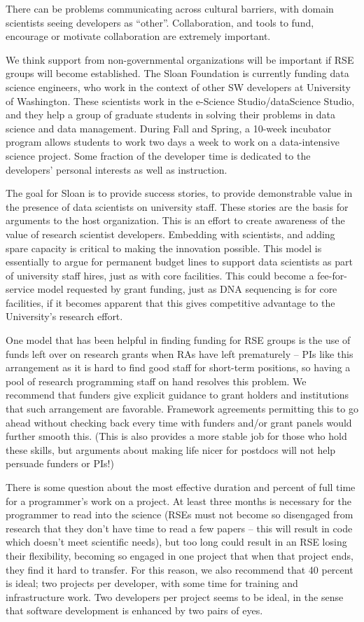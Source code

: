 There can be problems communicating across cultural barriers, with domain
scientists seeing developers as “other”.
Collaboration, and tools to fund, encourage or motivate collaboration are
extremely important.

We think support from non-governmental organizations will be important if RSE
groups will become established.
The Sloan Foundation is currently funding data science engineers, who work in
the context of other SW developers at University of Washington.
These scientists work in the e-Science Studio/dataScience Studio, and they
help a group of graduate students in solving their problems in data
science and data management. During Fall and Spring, a 10-week incubator program
allows students to work two days a week to work on a data-intensive science
project. Some fraction of the developer time is dedicated to the developers'
personal interests as well as instruction.

The goal for Sloan is to provide success stories, to provide demonstrable value
in the presence of data scientists on university staff. These stories are the
basis for arguments to the host organization. This is an effort to create
awareness of the value of research scientist developers. Embedding with
scientists, and adding spare capacity is critical to making the innovation
possible. This model is essentially to argue for permanent budget lines to
support data scientists as part of university staff hires, just as with core
facilities. This could become a fee-for-service model requested by grant
funding, just as DNA sequencing is for core facilities, if it becomes apparent
that this gives competitive advantage to the University’s research effort.

One model that has been helpful in finding funding for RSE groups is the use of
funds left over on research grants when RAs have left prematurely -- PIs like
this arrangement as it is hard to find good staff for short-term positions, so
having a pool of research programming staff on hand resolves this problem.
We recommend that funders give explicit guidance to grant holders and
institutions that such arrangement are favorable. Framework agreements
permitting this to go ahead without
checking back every time with funders and/or grant panels would further
smooth this.
(This is also provides a more stable job for those who hold these skills, but
arguments about making life nicer for postdocs will not help persuade funders
or PIs!)

There is some question about the most effective
duration and percent of full time for a programmer's work on a project.
At least three months is necessary for the programmer to read into the science
(RSEs must not become so disengaged from research that they don't have time to
read a few papers -- this will result in code which doesn't meet scientific
needs), but too long could result in an RSE losing their flexibility, becoming
so engaged in one project that when that project ends, they find it hard to
transfer. For this reason, we also recommend that 40 percent is ideal;
two projects per developer, with some time for training and infrastructure work.
Two developers per project seems to be ideal, in the sense that software
development is enhanced by two pairs of eyes.

